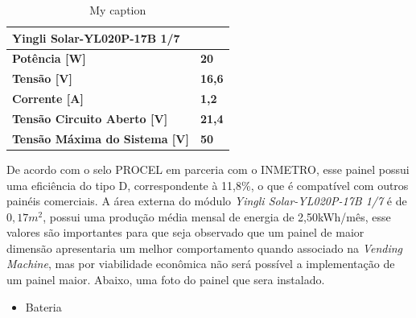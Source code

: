 \begin{table}[]
\centering
\caption{My caption}
\label{my-label}
\begin{tabular}{|l|l}
\cline{1-1}
\textbf{Yingli Solar-YL020P-17B 1/7} &                                    \\ \hline
\textbf{Potência {[}W{]}}                                                           & \multicolumn{1}{l|}{\textbf{20}}   \\ \hline
\textbf{Tensão {[}V{]}}                                                             & \multicolumn{1}{l|}{\textbf{16,6}} \\ \hline
\textbf{Corrente {[}A{]}}                                                           & \multicolumn{1}{l|}{\textbf{1,2}}  \\ \hline
\textbf{Tensão Circuito Aberto {[}V{]}}                                             & \multicolumn{1}{l|}{\textbf{21,4}} \\ \hline
\textbf{Tensão Máxima do Sistema {[}V{]}}                                           & \multicolumn{1}{l|}{\textbf{50}}   \\ \hline
\end{tabular}
\end{table}

        	De acordo com o selo PROCEL em parceria com o INMETRO, esse painel possui uma eficiência do tipo D, correspondente à 11,8\%, o que é compatível com outros painéis comerciais.
            A área externa do módulo \textit{Yingli Solar-YL020P-17B 1/7} é de $0,17m^{2}$, possui uma produção média mensal de energia de 2,50kWh/mês, esse valores são importantes para que seja observado que um painel de maior dimensão apresentaria um melhor comportamento quando associado na \textit{Vending Machine}, mas por viabilidade econômica não será possível a implementação de um painel maior.
            Abaixo, uma foto do painel que sera instalado.


\begin{itemize}
\item Bateria
\end{itemize}

